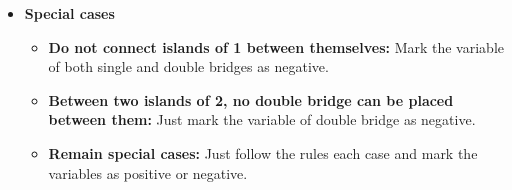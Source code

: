 \begin{itemize}
\begin{flushleft}
	      \end{flushleft}
	\item \textbf{Special cases}
	      \begin{flushleft}
		      \begin{itemize}
			      \item \textbf{Do not connect islands of 1 between themselves:} Mark the variable of both single and double bridges as negative.
			      \item \textbf{Between two islands of 2, no double bridge can be placed between them:} Just mark the variable of double bridge as negative.
			      \item \textbf{Remain special cases:} Just follow the rules each case and mark the variables as positive or negative.\\
		      \end{itemize}
	      \end{flushleft}
\end{itemize}

